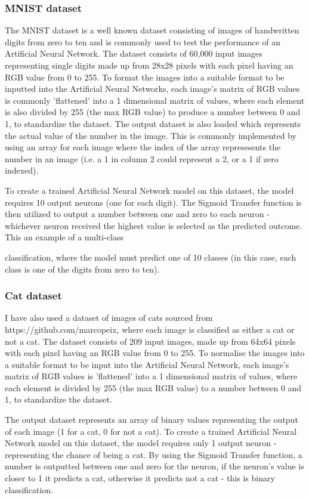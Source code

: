 \documentclass[./project-report/src/latex/project-report.tex]{subfiles}
\begin{document}
\subsubsection{MNIST dataset}

The MNIST dataset is a well known dataset consisting of images of handwritten digits from zero to ten and is commonly used to test the performance of an Artificial Neural 
Network. The dataset consists of 60,000 input images representing single digits made up from 28x28 pixels with each pixel having an RGB value from 0 to 255. To format the 
images into a suitable format to be inputted into the Artificial Neural Networks, each image's matrix of RGB values is commonly 'flattened' into a 1 dimensional matrix of 
values, where each element is also divided by 255 (the max RGB value) to produce a number between 0 and 1, to standardize the dataset. The output dataset is also loaded which 
represents the actual value of the number in the image. This is commonly implemented by using an array for each image where the index of the array represesents the number in 
an image (i.e. a 1 in column 2 could represent a 2, or a 1 if zero indexed).

To create a trained Artificial Neural Network model on this dataset, the model requires 10 output neurons (one for each digit). The Sigmoid Transfer function is then utilized 
to output a number between one and zero to each neuron - whichever neuron received the highest value is selected as the predicted outcome. This an example of a multi-class 

classification, where the model must predict one of 10 classes (in this case, each class is one of the digits from zero to ten).
\subsubsection{Cat dataset}

I have also used a dataset of images of cats sourced from https://github.com/marcopeix, where each image is classified as either a cat or not a cat. The dataset consists of 
209 input images, made up from 64x64 pixels with each pixel having an RGB value from 0 to 255. To normalise the images into a suitable format to be input into the Artificial 
Neural Network, each image's matrix of RGB values is 'flattened' into a 1 dimensional matrix of values, where each element is divided by 255 (the max RGB value) to a number 
between 0 and 1, to standardize the dataset.

The output dataset represents an array of binary values representing the output of each image (1 for a cat, 0 for not a cat). To create a trained Artificial Neural Network model 
on this dataset, the model requires only 1 output neuron - representing the chance of being a cat. By using the Sigmoid Transfer function, a number is outputted between one and zero 
for the neuron, if the neuron's value is closer to 1 it predicts a cat, otherwise it predicts not a cat - this is binary classification.
\end{document}
